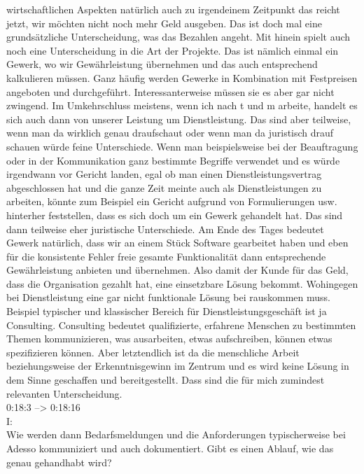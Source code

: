 wirtschaftlichen Aspekten natürlich auch zu irgendeinem Zeitpunkt das reicht jetzt, wir möchten nicht noch mehr Geld ausgeben. Das ist doch mal eine grundsätzliche Unterscheidung, was das Bezahlen angeht. Mit hinein spielt auch noch eine Unterscheidung in die Art der Projekte. Das ist nämlich einmal ein Gewerk, wo wir Gewährleistung übernehmen und das auch entsprechend kalkulieren müssen. Ganz häufig werden Gewerke in Kombination mit Festpreisen angeboten und durchgeführt. Interessanterweise müssen sie es aber gar nicht zwingend. Im Umkehrschluss meistens, wenn ich nach t und m arbeite, handelt es sich auch dann von unserer Leistung um Dienstleistung. Das sind aber teilweise, wenn man da wirklich genau draufschaut oder wenn man da juristisch drauf schauen würde feine Unterschiede. Wenn man beispielsweise bei der Beauftragung oder in der Kommunikation ganz bestimmte Begriffe verwendet und es würde irgendwann vor Gericht landen, egal ob man einen Dienstleistungsvertrag abgeschlossen hat und die ganze Zeit meinte auch als Dienstleistungen zu arbeiten, könnte zum Beispiel ein Gericht aufgrund von Formulierungen usw. hinterher feststellen, dass es sich doch um ein Gewerk gehandelt hat. Das sind dann teilweise eher juristische Unterschiede. Am Ende des Tages bedeutet Gewerk natürlich, dass wir an einem Stück Software gearbeitet haben und eben für die konsistente Fehler freie gesamte Funktionalität dann entsprechende Gewährleistung anbieten und übernehmen. Also damit der Kunde für das Geld, dass die Organisation gezahlt hat, eine einsetzbare Lösung bekommt. Wohingegen bei Dienstleistung eine gar nicht funktionale Lösung bei rauskommen muss. Beispiel typischer und klassischer Bereich für Dienstleistungsgeschäft ist ja Consulting. Consulting bedeutet qualifizierte, erfahrene Menschen zu bestimmten Themen kommunizieren, was ausarbeiten, etwas aufschreiben, können etwas spezifizieren können. Aber letztendlich ist da die menschliche Arbeit beziehungsweise der Erkenntnisgewinn im Zentrum und es wird keine Lösung in dem Sinne geschaffen und bereitgestellt. Dass sind die für mich zumindest relevanten Unterscheidung. \\

0:18:3 --> 0:18:16\\
I:\\
Wie werden dann Bedarfsmeldungen und die Anforderungen typischerweise bei Adesso kommuniziert und auch dokumentiert. Gibt es einen Ablauf, wie das genau gehandhabt wird?\\


